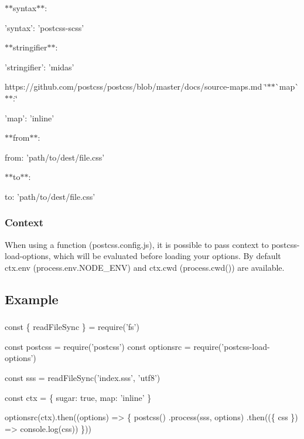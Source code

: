 $\ast$$\ast${\ttfamily syntax}$\ast$$\ast$\+:


\begin{DoxyCode}
'syntax': 'postcss-scss'
\end{DoxyCode}
 $\ast$$\ast${\ttfamily stringifier}$\ast$$\ast$\+:


\begin{DoxyCode}
'stringifier': 'midas'
\end{DoxyCode}


https\+://github.com/postcss/postcss/blob/master/docs/source-\/maps.\+md \char`\"{}$\ast$$\ast$\`{}map\`{}$\ast$$\ast$\+:\char`\"{}


\begin{DoxyCode}
'map': 'inline'
\end{DoxyCode}


$\ast$$\ast${\ttfamily from}$\ast$$\ast$\+:


\begin{DoxyCode}
from: 'path/to/dest/file.css'
\end{DoxyCode}


$\ast$$\ast${\ttfamily to}$\ast$$\ast$\+:


\begin{DoxyCode}
to: 'path/to/dest/file.css'
\end{DoxyCode}


\subsubsection*{Context}

When using a function {\ttfamily (postcss.\+config.\+js)}, it is possible to pass context to {\ttfamily postcss-\/load-\/options}, which will be evaluated before loading your options. By default {\ttfamily ctx.\+env (process.\+env.\+N\+O\+D\+E\+\_\+\+E\+NV)} and {\ttfamily ctx.\+cwd (process.\+cwd())} are available.

\subsection*{Example}

\subsubsection*{}


\begin{DoxyCode}
const \{ readFileSync \} = require('fs')

const postcss = require('postcss')
const optionsrc = require('postcss-load-options')

const sss =  readFileSync('index.sss', 'utf8')

const ctx = \{ sugar: true,  map: 'inline' \}

optionsrc(ctx).then((options) => \{
  postcss()
    .process(sss, options)
    .then((\{ css \}) => console.log(css))
\}))
\end{DoxyCode}


